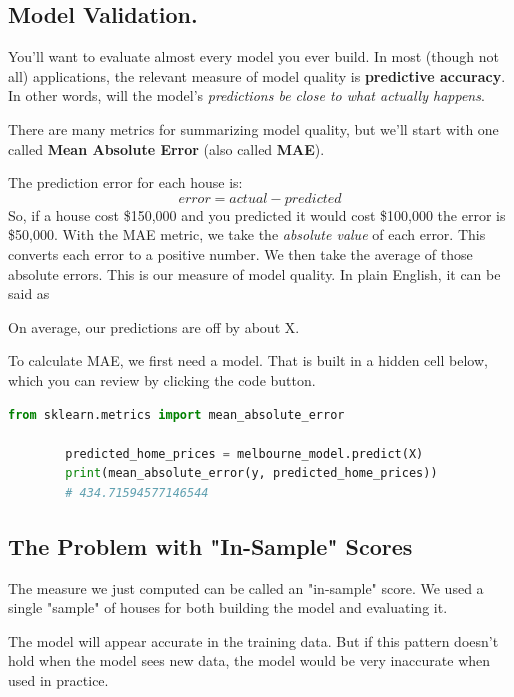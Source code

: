 \documentclass[11pt]{article}
\begin{document}
    \subsection{Model Validation.}\label{subsec:model_validation}
    You'll want to evaluate almost every model you ever build.
    In most (though not all) applications, the relevant measure of model quality is \textbf{predictive accuracy}.
    In other words, will the model's \textit{predictions be close to what actually happens}.

    There are many metrics for summarizing model quality, but we'll start with one called \textbf{Mean Absolute Error} (also called \textbf{MAE}).

    The prediction error for each house is:
    \[error=actual-predicted\]
    So, if a house cost \$150,000 and you predicted it would cost \$100,000 the error is \$50,000.
    With the MAE metric, we take the \textit{absolute value} of each error.
    This converts each error to a positive number.
    We then take the average of those absolute errors.
    This is our measure of model quality.
    In plain English, it can be said as

    On average, our predictions are off by about X.

    To calculate MAE, we first need a model.
    That is built in a hidden cell below, which you can review by clicking the code button.

    \begin{lstlisting}[style=light, language=Python,label={lst:vectorimg},caption=The mean absolute error calculcation]
        from sklearn.metrics import mean_absolute_error

        predicted_home_prices = melbourne_model.predict(X)
        print(mean_absolute_error(y, predicted_home_prices))
        # 434.71594577146544
    \end{lstlisting}

    \subsection{The Problem with "In-Sample" Scores}\label{subsec:in_sample_problem}
    The measure we just computed can be called an "in-sample" score.
    We used a single "sample" of houses for both building the model and evaluating it.

    The model will appear accurate in the training data.
    But if this pattern doesn't hold when the model sees new data, the model would be very inaccurate when used in practice.
\end{document}
